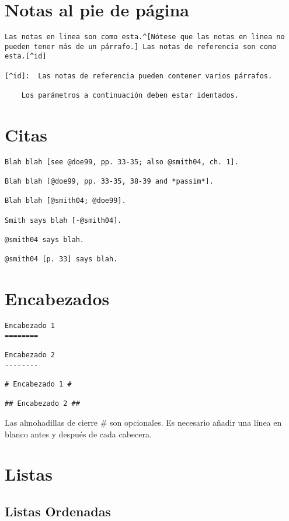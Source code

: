 \documentclass[12pt,spanish,]{article}
\begin{document}
\section{Notas al pie de página}\label{notas-al-pie-de-puxe1gina}

\begin{verbatim}
Las notas en linea son como esta.^[Nótese que las notas en linea no pueden tener más de un párrafo.] Las notas de referencia son como esta.[^id]

[^id]:  Las notas de referencia pueden contener varios párrafos.

    Los parámetros a continuación deben estar identados.
\end{verbatim}

\section{Citas}\label{citas}

\begin{verbatim}
Blah blah [see @doe99, pp. 33-35; also @smith04, ch. 1].

Blah blah [@doe99, pp. 33-35, 38-39 and *passim*].

Blah blah [@smith04; @doe99].

Smith says blah [-@smith04].

@smith04 says blah.

@smith04 [p. 33] says blah.
\end{verbatim}

\section{Encabezados}\label{encabezados}

\begin{verbatim}
Encabezado 1
========

Encabezado 2
--------

# Encabezado 1 #

## Encabezado 2 ##
\end{verbatim}

Las almohadillas de cierre \# son opcionales. Es necesario añadir una
línea en blanco antes y después de cada cabecera.

\section{Listas}\label{listas}

\subsection{Listas Ordenadas}\label{listas-ordenadas}
\end{document}
